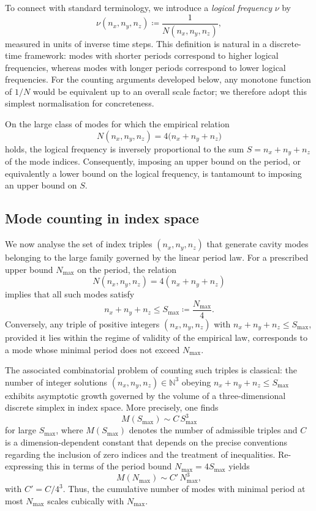 \documentclass{article}
\theoremstyle{definition}
\begin{document}
To connect with standard terminology, we introduce a \emph{logical frequency} $\nu$ by
\[
\nu(n_x,n_y,n_z) \coloneqq \frac{1}{N(n_x,n_y,n_z)},
\]
measured in units of inverse time steps.\cite{Effective_Fields_PDL_2026} This definition is natural in a discrete-time framework: modes with shorter periods correspond to higher logical frequencies, whereas modes with longer periods correspond to lower logical frequencies. For the counting arguments developed below, any monotone function of $1/N$ would be equivalent up to an overall scale factor; we therefore adopt this simplest normalisation for concreteness.

On the large class of modes for which the empirical relation
\[
N(n_x,n_y,n_z) = 4 \bigl(n_x + n_y + n_z\bigr)
\]
holds, the logical frequency is inversely proportional to the sum $S = n_x + n_y + n_z$ of the mode indices. Consequently, imposing an upper bound on the period, or equivalently a lower bound on the logical frequency, is tantamount to imposing an upper bound on $S$.\cite{Effective_Fields_PDL_2026}

\subsection{Mode counting in index space}

We now analyse the set of index triples $(n_x,n_y,n_z)$ that generate cavity modes belonging to the large family governed by the linear period law. For a prescribed upper bound $N_{\max}$ on the period, the relation
\[
N(n_x,n_y,n_z) = 4 (n_x+n_y+n_z)
\]
implies that all such modes satisfy
\[
n_x + n_y + n_z \le S_{\max} \coloneqq \frac{N_{\max}}{4}.
\]
Conversely, any triple of positive integers $(n_x,n_y,n_z)$ with $n_x+n_y+n_z \le S_{\max}$, provided it lies within the regime of validity of the empirical law, corresponds to a mode whose minimal period does not exceed $N_{\max}$.\cite{Effective_Fields_PDL_2026}

The associated combinatorial problem of counting such triples is classical: the number of integer solutions $(n_x,n_y,n_z) \in \mathbb{N}^3$ obeying $n_x+n_y+n_z \le S_{\max}$ exhibits asymptotic growth governed by the volume of a three-dimensional discrete simplex in index space.\cite{Density_of_states_Notes,Counting_States_2021} More precisely, one finds
\[
M(S_{\max}) \sim C\, S_{\max}^3
\]
for large $S_{\max}$, where $M(S_{\max})$ denotes the number of admissible triples and $C$ is a dimension-dependent constant that depends on the precise conventions regarding the inclusion of zero indices and the treatment of inequalities.\cite{Density_of_states_Notes,Counting_States_2021} Re-expressing this in terms of the period bound $N_{\max} = 4 S_{\max}$ yields
\[
M(N_{\max}) \sim C' \, N_{\max}^3,
\]
with $C' = C/4^3$. Thus, the cumulative number of modes with minimal period at most $N_{\max}$ scales cubically with $N_{\max}$.
\end{document}
